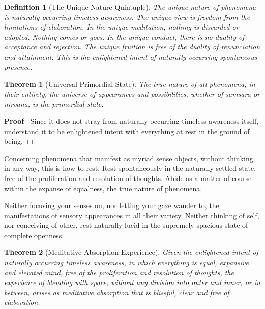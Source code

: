 \documentclass{article}
\newenvironment{proof}{\noindent\textbf{Proof\ }}{\hspace*{\fill}$\Box$\medskip}
\newtheorem{definition}{Definition}
\newtheorem{theorem}{Theorem}
\begin{document}
\begin{definition}
  [The Unique Nature Quintuple] The unique nature of phenomena is naturally
  occurring timeless awareness. The unique view is freedom from the
  limitations of elaboration. In the unique meditation, nothing is discarded
  or adopted. Nothing comes or goes. In the unique conduct, there is no
  duality of acceptance and rejection. The unique fruition is free of the
  duality of renunciation and attainment. This is the enlightened intent of
  naturally occurring spontaneous presence.
\end{definition}

\begin{theorem}
  [Universal Primordial State] The true nature of all phenomena, in their
  entirety, the universe of appearances and possibilities, whether of samsara
  or nirvana, is the primordial state.
\end{theorem}

\begin{proof}
  Since it does not stray from naturally occurring timeless awareness itself,
  understand it to be enlightened intent with everything at rest in the ground
  of being.
\end{proof}

\begin{remark}
   Concerning phenomena that manifest as myriad sense objects,
  without thinking in any way, this is how to rest. Rest spontaneously in the
  naturally settled state, free of the proliferation and resolution of
  thoughts. Abide as a matter of course within the expanse of equalness, the
  true nature of phenomena.
  
  Neither focusing your senses on, nor letting your gaze wander to, the
  manifestations of sensory appearances in all their variety. Neither thinking
  of self, nor conceiving of other, rest naturally lucid in the supremely
  spacious state of complete openness.
\end{remark}

\begin{theorem}
  [Meditative Absorption Experience] Given the enlightened intent of naturally
  occurring timeless awareness, in which everything is equal, expansive and
  elevated mind, free of the proliferation and resolution of thoughts, the
  experience of blending with space, without any division into outer and
  inner, or in between, arises as meditative absorption that is blissful,
  clear and free of elaboration.
\end{theorem}
\end{document}
